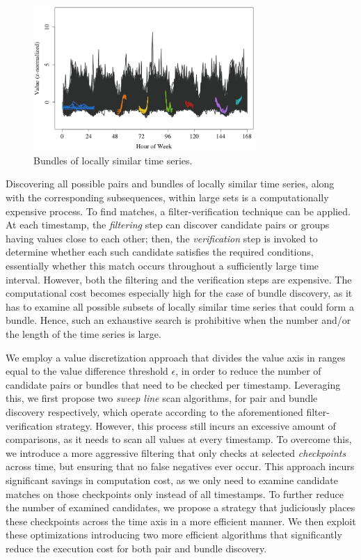 \begin{figure}[!tb]
    \centering
    \includegraphics[width=0.75\textwidth]{figures/bundles_water.png}
    \caption{Bundles of locally similar time series.}
    \label{fig:bundles_water}
\end{figure}

Discovering all possible pairs and bundles of locally similar time series, along with the corresponding subsequences, within large sets is a computationally expensive process. To find matches, a filter-verification technique can be applied. At each timestamp, the {\em filtering} step can discover candidate pairs or groups having values close to each other; then, the {\em verification} step is invoked to determine whether each such candidate satisfies the required conditions, essentially whether this match occurs throughout a sufficiently large time interval. However, both the filtering and the verification steps are expensive. The computational cost becomes especially high for the case of bundle discovery, as it has to examine all possible subsets of locally similar time series that could form a bundle. Hence, such an exhaustive search is prohibitive when the number and/or the length of the time series is large.

We employ a value discretization approach that divides the value axis in ranges equal to the value difference threshold $\epsilon$, in order to reduce the number of candidate pairs or bundles that need to be checked per timestamp. Leveraging this, we first propose two \textit{sweep line} scan algorithms, for pair and bundle discovery respectively, which operate according to the aforementioned filter-verification strategy. However, this process still incurs an excessive amount of comparisons, as it needs to scan all values at every timestamp. To overcome this, we introduce a more aggressive filtering  that only checks at selected \textit{checkpoints} across time, but ensuring that no false negatives ever occur. This approach incurs significant savings in computation cost, as we only need to examine candidate matches on those checkpoints only instead of all timestamps. To further reduce the number of examined candidates, we propose a strategy that judiciously places these checkpoints across the time axis in a more efficient manner. We then exploit these optimizations introducing two more efficient algorithms that significantly reduce the execution cost for both pair and bundle discovery.

